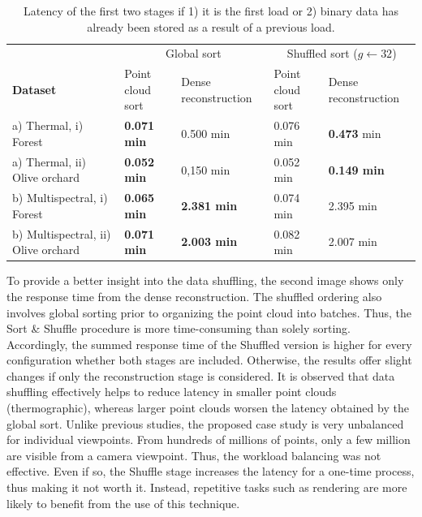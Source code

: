 \renewcommand{\arraystretch}{1.2}
\begin{table}
    \sffamily\footnotesize
    \centering
    \caption{Latency of the first two stages if 1) it is the first load or 2) binary data has already been stored as a result of a previous load. }
    \label{table:shuffling_results}    
    \begin{tabular}{l@{\hskip 0.07in}|ll|ll}
    \toprule
     & \multicolumn{2}{c}{Global sort} & \multicolumn{2}{c}{Shuffled sort ($g \gets 32$)}\\
    \cmidrule{1-5}
    \textbf{Dataset} & Point cloud sort & Dense reconstruction &  Point cloud sort & Dense reconstruction\\
    \cmidrule{1-5}
    a) Thermal, i) Forest & \textbf{0.071 \si{\minute}} & 0.500 \si{\minute}
    & 0.076 \si{\minute} & \textbf{0.473} \si{\minute}\\
    \cmidrule{1-5}
    a) Thermal, ii) Olive orchard & \textbf{0.052 \si{\minute}} & 0,150 \si{\minute}
    & 0.052 \si{\minute} & \textbf{0.149 \si{\minute}}\\
    \cmidrule{1-5}
    b) Multispectral, i) Forest & \textbf{0.065 \si{\minute}} & \textbf{2.381 \si{\minute}}
    & 0.074 \si{\minute} & 2.395 \si{\minute}\\
    \cmidrule{1-5}
    b) Multispectral, ii) Olive orchard & \textbf{0.071 \si{\minute}} & \textbf{2.003 \si{\minute}}
    & 0.082 \si{\minute} & 2.007 \si{\minute}\\
    \bottomrule
    \end{tabular}
\end{table}
\renewcommand{\arraystretch}{1}

To provide a better insight into the data shuffling, the second image shows only the response time from the dense reconstruction. The shuffled ordering also involves global sorting prior to organizing the point cloud into batches. Thus, the Sort \& Shuffle procedure is more time-consuming than solely sorting. Accordingly, the summed response time of the Shuffled version is higher for every configuration whether both stages are included. Otherwise, the results offer slight changes if only the reconstruction stage is considered. It is observed that data shuffling effectively helps to reduce latency in smaller point clouds (thermographic), whereas larger point clouds worsen the latency obtained by the global sort. Unlike previous studies, the proposed case study is very unbalanced for individual viewpoints. From hundreds of millions of points, only a few million are visible from a camera viewpoint. Thus, the workload balancing was not effective. Even if so, the Shuffle stage increases the latency for a one-time process, thus making it not worth it. Instead, repetitive tasks such as rendering are more likely to benefit from the use of this technique.

